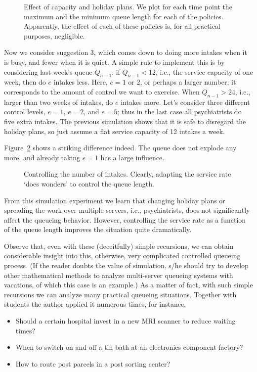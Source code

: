 \begin{figure}[ht]
  \centering
 
\caption{Effect of capacity and holiday plans. We plot for each time point
  the maximum and the minimum queue length for each of the
  policies. Apparently, the effect of each of these policies is, for
  all practical purposes, negligible.  }
\label{fig:balanced}
\end{figure}


Now we consider suggestion 3, which comes down to doing more intakes
when it is busy, and fewer when it is quiet. A simple rule to
implement this is by considering last week's queue $Q_{n-1}$: if
$Q_{n-1}<12$, i.e., the service capacity of one week, then do $e$
intakes less. Here, $e=1$ or $2$, or perhaps a larger number; it
corresponds to the amount of control we want to exercise. When
$Q_{n-1}>24$, i.e., larger than two weeks of intakes, do $e$ intakes
more. Let's consider three different control levels, $e=1$, $e=2$, and
$e=5$; thus in the last case all psychiatrists do five extra intakes.
The previous simulation shows that it is safe to disregard the holiday
plans, so just assume a flat service capacity of 12 intakes a week.

Figure~\ref{fig:intakes} shows a striking difference indeed. The queue
does not explode any more, and already taking $e=1$ has a large
influence. 

\begin{figure}[ht]
  \centering
  
\caption{Controlling the number of intakes. Clearly, adapting the
  service rate `does wonders' to control the queue length.}
\label{fig:intakes}
\end{figure}

From this simulation experiment we learn that changing holiday plans or
spreading the work over multiple servers, i.e., psychiatrists, does
not significantly affect the queueing behavior.  However, controlling
the service rate as a function of the queue length improves the
situation quite dramatically. 


Observe that, even with these (deceitfully) simple recursions, we can obtain
considerable insight into this, otherwise, very complicated controlled
queueing process. (If the reader doubts the value of simulation, s/he
should try to develop other mathematical methods to analyze
multi-server queueing systems with vacations, of which this case is an
example.) As a matter of fact, with such simple recursions we can analyze many practical queueing
situations. Together with students the author applied it numerous
times, for instance,
\begin{itemize}
\item Should a certain hospital invest in a new MRI scanner to reduce
  waiting times?
\item When to switch on and off a tin bath at an electronics component factory?
\item How to route post parcels in a post sorting center?
\end{itemize}

